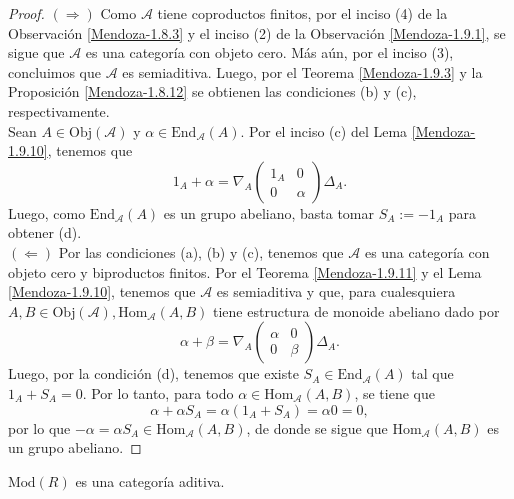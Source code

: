 \documentclass[tesis]{subfiles}
\begin{document}
\begin{proof}\leavevmode
    
    $(\Rightarrow)$ Como $\mathscr{A}$ tiene coproductos finitos, por el inciso (4) de la Observación \ref{Mendoza-1.8.3} y el inciso (2) de la Observación \ref{Mendoza-1.9.1}, se sigue que $\mathscr{A}$ es una categoría con objeto cero. Más aún, por el inciso (3), concluimos que $\mathscr{A}$ es semiaditiva. Luego, por el Teorema \ref{Mendoza-1.9.3} y la Proposición \ref{Mendoza-1.8.12} se obtienen las condiciones (b) y (c), respectivamente. \\

    Sean $A\in\text{Obj}(\mathscr{A})$ y $\alpha\in\text{End}_\mathscr{A}(A)$. Por el inciso (c) del Lema \ref{Mendoza-1.9.10}, tenemos que
    \[
        1_A + \alpha = \nabla_A \begin{pmatrix} 1_A & 0 \\ 0 & \alpha \end{pmatrix} \Delta_A.
    \] 
    Luego, como $\text{End}_\mathscr{A}(A)$ es un grupo abeliano, basta tomar $S_A:=-1_A$ para obtener (d). \\

    $(\Leftarrow)$ Por las condiciones (a), (b) y (c), tenemos que $\mathscr{A}$ es una categoría con objeto cero y biproductos finitos. Por el Teorema \ref{Mendoza-1.9.11} y el Lema \ref{Mendoza-1.9.10}, tenemos que $\mathscr{A}$ es semiaditiva y que, para cualesquiera $A,B\in\text{Obj}(\mathscr{A}), \text{Hom}_\mathscr{A}(A,B)$ tiene estructura de monoide abeliano dado por
    \[
        \alpha+\beta = \nabla_A \begin{pmatrix} \alpha & 0 \\ 0 & \beta \end{pmatrix} \Delta_A.
    \] 
    Luego, por la condición (d), tenemos que existe $S_A\in\text{End}_\mathscr{A}(A)$ tal que $1_A+S_A=0$. Por lo tanto, para todo $\alpha\in\text{Hom}_\mathscr{A}(A,B)$, se tiene que 
    \[
        \alpha+\alpha S_A = \alpha(1_A+S_A) = \alpha0 = 0,
    \] 
    por lo que $-\alpha=\alpha S_A\in\text{Hom}_\mathscr{A}(A,B)$, de donde se sigue que $\text{Hom}_\mathscr{A}(A,B)$ es un grupo abeliano.
\end{proof}

\begin{Ejem}\label{Ejem: Categoría aditiva}
    $\text{Mod}(R)$ es una categoría aditiva.
\end{Ejem}

\end{document}
